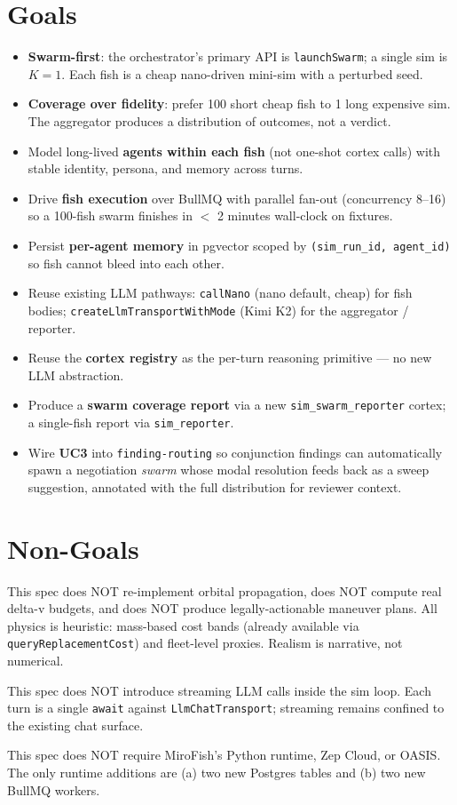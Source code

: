 \section{Goals}
\begin{itemize}[leftmargin=1.2em]
  \item \textbf{Swarm-first}: the orchestrator's primary API is \texttt{launchSwarm}; a single sim is $K=1$. Each fish is a cheap nano-driven mini-sim with a perturbed seed.
  \item \textbf{Coverage over fidelity}: prefer 100 short cheap fish to 1 long expensive sim. The aggregator produces a distribution of outcomes, not a verdict.
  \item Model long-lived \textbf{agents within each fish} (not one-shot cortex calls) with stable identity, persona, and memory across turns.
  \item Drive \textbf{fish execution} over BullMQ with parallel fan-out (concurrency 8--16) so a 100-fish swarm finishes in $<$ 2 minutes wall-clock on fixtures.
  \item Persist \textbf{per-agent memory} in pgvector scoped by \texttt{(sim\_run\_id, agent\_id)} so fish cannot bleed into each other.
  \item Reuse existing LLM pathways: \texttt{callNano} (nano default, cheap) for fish bodies; \texttt{createLlmTransportWithMode} (Kimi K2) for the aggregator / reporter.
  \item Reuse the \textbf{cortex registry} as the per-turn reasoning primitive --- no new LLM abstraction.
  \item Produce a \textbf{swarm coverage report} via a new \texttt{sim\_swarm\_reporter} cortex; a single-fish report via \texttt{sim\_reporter}.
  \item Wire \textbf{UC3} into \texttt{finding-routing} so conjunction findings can automatically spawn a negotiation \emph{swarm} whose modal resolution feeds back as a sweep suggestion, annotated with the full distribution for reviewer context.
\end{itemize}

\section{Non-Goals}
\begin{nongoal}
This spec does NOT re-implement orbital propagation, does NOT compute real delta-v budgets, and does NOT produce legally-actionable maneuver plans. All physics is heuristic: mass-based cost bands (already available via \texttt{queryReplacementCost}) and fleet-level proxies. Realism is narrative, not numerical.
\end{nongoal}
\begin{nongoal}
This spec does NOT introduce streaming LLM calls inside the sim loop. Each turn is a single \texttt{await} against \texttt{LlmChatTransport}; streaming remains confined to the existing chat surface.
\end{nongoal}
\begin{nongoal}
This spec does NOT require MiroFish's Python runtime, Zep Cloud, or OASIS. The only runtime additions are (a) two new Postgres tables and (b) two new BullMQ workers.
\end{nongoal}

